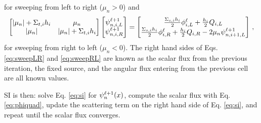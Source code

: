 for sweeping from left to right ($\mu_n > 0$) and 
	\begin{equation} \label{eq:sweepRL}
		\left[\begin{matrix} 
			|\mu_n| + \Sigma_{t,i}h_i & \mu_n \\ 
			|\mu_n| & |\mu_n| + \Sigma_{t,i}h_i \\ 
		\end{matrix} \right]
		\left[\begin{matrix}
			\psi_{n,i,L}^{\ell+1} \\ \psi_{n,i,R}^{\ell+1}
		\end{matrix} \right]
		= \left[\begin{matrix}
			\frac{\Sigma_{s,i}h_i}{2} \phi_{i,L}^\ell + \frac{h_i}{2} Q_{i,L} \\ 
			\frac{\Sigma_{s,i}h_i}{2} \phi_{i,R}^\ell + \frac{h_i}{2} Q_{i,R} - 2\mu_n \psi_{n,i+1,L}^{\ell+1}
		\end{matrix} \right]
		\,, 
	\end{equation}
for sweeping from right to left ($\mu_n < 0$). The right hand sides of Eqs. \ref{eq:sweepLR} and \ref{eq:sweepRL} are known as the scalar flux from the previous iteration, the fixed source, and the angular flux entering from the previous cell are all known values. 

SI is then: solve Eq. \ref{eq:si} for $\psi_n^{\ell+1}(x)$, compute the scalar flux with Eq. \ref{eq:phiquad}, update the scattering term on the right hand side of Eq. \ref{eq:si}, and repeat until the scalar flux converges. 
